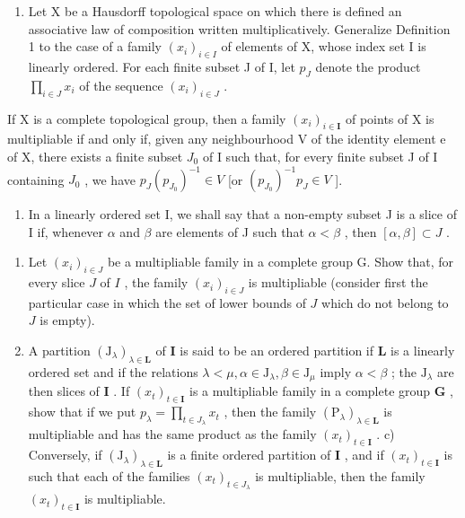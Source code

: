 \ExerciseAppendix

\begin{enumerate}
\def\labelenumi{\arabic{enumi})}
\tightlist
\item
  Let X be a Hausdorff topological space on which there is defined an associative law of composition written multiplicatively. Generalize Definition 1 to the case of a family \((x_{i})_{i\in I}\) of elements of X, whose index set I is linearly ordered. For each finite subset J of I, let \(p_{J}\) denote the product \(\prod_{i\in J} x_{i}\) of the sequence \((x_{i})_{i\in J}\) .
\end{enumerate}

If X is a complete topological group, then a family \((x_{i})_{i\in\mathbf{I}}\) of points of X is multipliable if and only if, given any neighbourhood V of the identity element e of X, there exists a finite subset \(J_{0}\) of I such that, for every finite subset J of I containing \(J_{0}\) , we have \(p_{J}(p_{J_{0}})^{-1}\in V\) {[}or \((p_{J_{0}})^{-1}p_{J}\in V\) {]}.

\begin{enumerate}
\def\labelenumi{\arabic{enumi})}
\setcounter{enumi}{1}
\tightlist
\item
  In a linearly ordered set I, we shall say that a non-empty subset J is a slice of I if, whenever \(\alpha\) and \(\beta\) are elements of J such that \(\alpha < \beta\) , then \([\alpha, \beta] \subset J\) .
\end{enumerate}

\begin{enumerate}
\def\labelenumi{\alph{enumi})}
\item
  Let \((x_{i})_{i\in J}\) be a multipliable family in a complete group G. Show that, for every slice \(J\) of \(I\) , the family \((x_{i})_{i\in J}\) is multipliable (consider first the particular case in which the set of lower bounds of \(J\) which do not belong to \(J\) is empty).
\item
  A partition \((\mathrm{J}_{\lambda})_{\lambda \in \mathbf{L}}\) of \(\mathbf{I}\) is said to be an ordered partition if \(\mathbf{L}\) is a linearly ordered set and if the relations \(\lambda < \mu, \alpha \in \mathrm{J}_{\lambda}, \beta \in \mathrm{J}_{\mu}\) imply \(\alpha < \beta\) ; the \(\mathrm{J}_{\lambda}\) are then slices of \(\mathbf{I}\) . If \((x_{t})_{t \in \mathbf{I}}\) is a multipliable family in a complete group \(\mathbf{G}\) , show that if we put \(p_{\lambda} = \prod_{t \in J_{\lambda}} x_{t}\) , then the family \((\mathrm{P}_{\lambda})_{\lambda \in \mathbf{L}}\) is multipliable and has the same product as the family \((x_{t})_{t \in \mathbf{I}}\) . c) Conversely, if \((\mathrm{J}_{\lambda})_{\lambda \in \mathbf{L}}\) is a finite ordered partition of \(\mathbf{I}\) , and if \((x_{t})_{t \in \mathbf{I}}\) is such that each of the families \((x_{t})_{t \in J_{\lambda}}\) is multipliable, then the family \((x_{t})_{t \in \mathbf{I}}\) is multipliable.
\end{enumerate}

